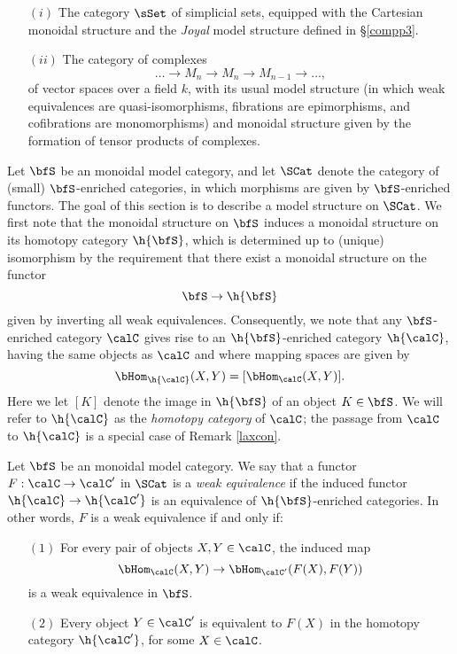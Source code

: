 \begin{itemize}
\item[$(i)$] The category $\sSet$ of simplicial sets, equipped with the Cartesian monoidal structure and the {\em Joyal} model structure defined in \S \ref{compp3}.
\item[$(ii)$] The category of complexes
$$ \ldots \rightarrow M_{n} \rightarrow M_{n} \rightarrow M_{n-1} \rightarrow \ldots, $$
of vector spaces over a field $k$, with its usual model structure (in which weak equivalences are quasi-isomorphisms, fibrations are epimorphisms, and cofibrations are monomorphisms) and monoidal structure given by the formation of tensor products of complexes.
\end{itemize}

Let $\bfS$ be an monoidal model category, and let $\SCat$ denote the category of (small) $\bfS$-enriched categories, in which morphisms are
given by $\bfS$-enriched functors. The goal of this section is to describe a model structure on $\SCat$. 
We first note that the monoidal structure on $\bfS$ induces a monoidal structure on its
homotopy category $\h{\bfS}$, which is determined up to (unique) isomorphism by the requirement that there exist a monoidal structure on the functor
$$ \bfS \rightarrow \h{\bfS} $$
given by inverting all weak equivalences. Consequently, 
we note that any $\bfS$-enriched category $\calC$ gives rise to an $\h{\bfS}$-enriched category $\h{\calC}$, having the same objects as $\calC$ and where mapping spaces are given by
$$ \bHom_{\h{\calC}}(X,Y) = [ \bHom_{\calC}(X,Y) ].$$
Here we let $[K]$ denote the image in $\h{\bfS}$ of an object $K \in \bfS$. We will refer to
$\h{\calC}$ as the {\it homotopy category} of $\calC$; the passage from
$\calC$ to $\h{\calC}$ is a special case of Remark \ref{laxcon}.

\begin{definition}\label{equivdefequiv}
Let $\bfS$ be an monoidal model category.
We say that a functor $F: \calC \rightarrow \calC'$ in $\SCat$ is a {\it weak equivalence}
if the induced functor $\h{\calC} \rightarrow \h{\calC'}$ is an equivalence of $\h{\bfS}$-enriched categories. In other words, $F$ is a weak equivalence if and only if:

\begin{itemize}
\item[$(1)$] For every pair of objects $X,Y \in \calC$, the induced map
$$ \bHom_{\calC}(X,Y) \rightarrow \bHom_{\calC'}(F(X),F(Y))$$ is a weak equivalence in $\bfS$.
\item[$(2)$] Every object $Y \in \calC'$ is equivalent to $F(X)$ in the homotopy category $\h{\calC'}$, for some $X \in \calC$.
\end{itemize}
\end{definition}

